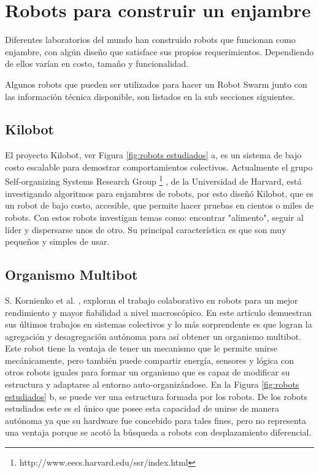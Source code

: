 \section{Robots para construir un enjambre}

Diferentes laboratorios del mundo han construido robots que funcionan como enjambre, con algún diseño que satisface sus propios requerimientos. Dependiendo de ellos varían en costo, tamaño y funcionalidad.

Algunos robots que pueden ser utilizados para hacer un Robot Swarm junto con las información técnica disponible, son listados en la sub secciones siguientes.

\subsection{Kilobot}
El proyecto Kilobot, ver Figura \ref{fig:robots estudiados} a, es un sistema de bajo costo escalable para demostrar comportamientos colectivos. Actualmente el grupo Self-organizing Systems Research Group \footnote{http://www.eecs.harvard.edu/ssr/index.html} , de la Universidad de Harvard, está investigando algoritmos para enjambres de robots, por esto diseñó Kilobot, que es un robot de bajo costo, accesible,  que permite hacer pruebas en cientos o miles de robots. Con estos robots investigan temas como: encontrar "alimento", seguir al líder y dispersarse unos de otro. Su principal característica es que son muy pequeños y simples de usar.

\subsection{Organismo Multibot}
S. Kornienko et al. \cite{5359578}, exploran el trabajo colaborativo en robots para un mejor rendimiento y mayor fiabilidad a nivel macroscópico. En este artículo demuestran sus últimos trabajos en sistemas colectivos y lo más sorprendente es que logran la agregación y desagregación autónoma para así obtener un organismo multibot. Este robot tiene la ventaja de tener un mecanismo que le permite unirse mecánicamente, pero también puede compartir energía, sensores y lógica con otros robots iguales para formar un organismo que es capaz de modificar su estructura y adaptarse al entorno auto-organizándose. En la Figura \ref{fig:robots estudiados} b, se puede ver una estructura formada por los robots. De los robots estudiados este es el único que posee esta capacidad de unirse de manera autónoma ya que su hardware fue concebido para tales fines, pero no representa una ventaja porque se acotó la búsqueda a robots con desplazamiento diferencial.

